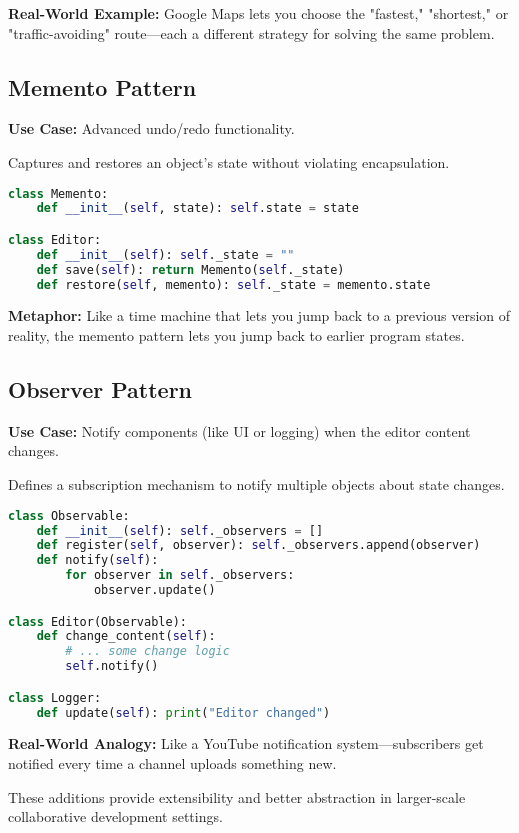 \documentclass[12pt]{article}
\begin{document}
\textbf{Real-World Example:} Google Maps lets you choose the "fastest," "shortest," or "traffic-avoiding" route—each a different strategy for solving the same problem.

\newpage

\subsection{Memento Pattern}
\textbf{Use Case:} Advanced undo/redo functionality.

Captures and restores an object's state without violating encapsulation.

\begin{lstlisting}[language=Python]
class Memento:
    def __init__(self, state): self.state = state

class Editor:
    def __init__(self): self._state = ""
    def save(self): return Memento(self._state)
    def restore(self, memento): self._state = memento.state
\end{lstlisting}

\textbf{Metaphor:} Like a time machine that lets you jump back to a previous version of reality, the memento pattern lets you jump back to earlier program states.

\subsection{Observer Pattern}
\textbf{Use Case:} Notify components (like UI or logging) when the editor content changes.

Defines a subscription mechanism to notify multiple objects about state changes.

\begin{lstlisting}[language=Python]
class Observable:
    def __init__(self): self._observers = []
    def register(self, observer): self._observers.append(observer)
    def notify(self): 
        for observer in self._observers:
            observer.update()

class Editor(Observable):
    def change_content(self):
        # ... some change logic
        self.notify()

class Logger:
    def update(self): print("Editor changed")
\end{lstlisting}

\textbf{Real-World Analogy:} Like a YouTube notification system—subscribers get notified every time a channel uploads something new.

These additions provide extensibility and better abstraction in larger-scale collaborative development settings.
\end{document}
